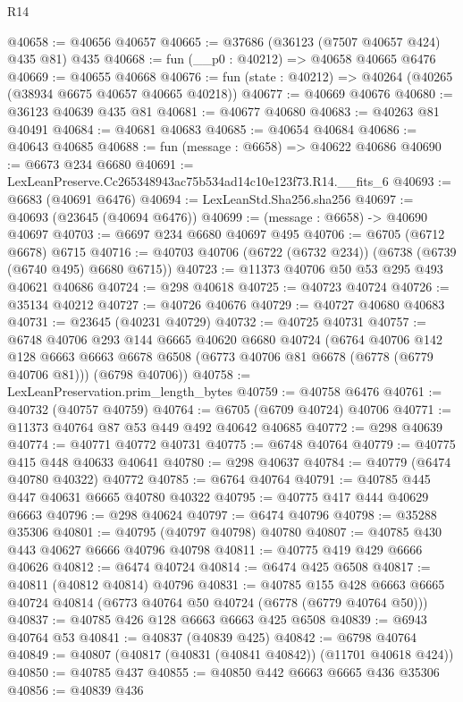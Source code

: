\begin{lexlean}{R14}
\begin{coremodule}
@40658 := @40656 @40657
@40665 := @37686 (@36123 (@7507 @40657 @424) @435 @81) @435
@40668 := fun (__p0 : @40212) => @40658 @40665 @6476
@40669 := @40655 @40668
@40676 := fun (state : @40212) => @40264 (@40265 (@38934 @6675 @40657 @40665 @40218))
@40677 := @40669 @40676
@40680 := @36123 @40639 @435 @81
@40681 := @40677 @40680
@40683 := @40263 @81 @40491
@40684 := @40681 @40683
@40685 := @40654 @40684
@40686 := @40643 @40685
@40688 := fun (message : @6658) => @40622 @40686
@40690 := @6673 @234 @6680
@40691 := LexLeanPreserve.Cc265348943ac75b534ad14c10e123f73.R14.__fits_6
@40693 := @6683 (@40691 @6476)
@40694 := LexLeanStd.Sha256.sha256
@40697 := @40693 (@23645 (@40694 @6476))
@40699 := (message : @6658) -> @40690 @40697
@40703 := @6697 @234 @6680 @40697 @495
@40706 := @6705 (@6712 @6678) @6715
@40716 := @40703 @40706 (@6722 (@6732 @234)) (@6738 (@6739 (@6740 @495) @6680 @6715))
@40723 := @11373 @40706 @50 @53 @295 @493 @40621 @40686
@40724 := @298 @40618
@40725 := @40723 @40724
@40726 := @35134 @40212
@40727 := @40726 @40676
@40729 := @40727 @40680 @40683
@40731 := @23645 (@40231 @40729)
@40732 := @40725 @40731
@40757 := @6748
    @40706
    @293
    @144
    @6665
    @40620
    @6680
    @40724
    (@6764
      @40706
      @142
      @128
      @6663
      @6663
      @6678
      @6508
      (@6773 @40706 @81 @6678 (@6778 (@6779 @40706 @81)))
      (@6798 @40706))
@40758 := LexLeanPreservation.prim_length_bytes
@40759 := @40758 @6476
@40761 := @40732 (@40757 @40759)
@40764 := @6705 (@6709 @40724) @40706
@40771 := @11373 @40764 @87 @53 @449 @492 @40642 @40685
@40772 := @298 @40639
@40774 := @40771 @40772 @40731
@40775 := @6748 @40764
@40779 := @40775 @415 @448 @40633 @40641
@40780 := @298 @40637
@40784 := @40779 (@6474 @40780 @40322) @40772
@40785 := @6764 @40764
@40791 := @40785 @445 @447 @40631 @6665 @40780 @40322
@40795 := @40775 @417 @444 @40629 @6663
@40796 := @298 @40624
@40797 := @6474 @40796
@40798 := @35288 @35306
@40801 := @40795 (@40797 @40798) @40780
@40807 := @40785 @430 @443 @40627 @6666 @40796 @40798
@40811 := @40775 @419 @429 @6666 @40626
@40812 := @6474 @40724
@40814 := @6474 @425 @6508
@40817 := @40811 (@40812 @40814) @40796
@40831 := @40785
    @155
    @428
    @6663
    @6665
    @40724
    @40814
    (@6773 @40764 @50 @40724 (@6778 (@6779 @40764 @50)))
@40837 := @40785 @426 @128 @6663 @6663 @425 @6508
@40839 := @6943 @40764 @53
@40841 := @40837 (@40839 @425)
@40842 := @6798 @40764
@40849 := @40807 (@40817 (@40831 (@40841 @40842)) (@11701 @40618 @424))
@40850 := @40785 @437
@40855 := @40850 @442 @6663 @6665 @436 @35306
@40856 := @40839 @436

\end{coremodule}
\end{lexlean}
